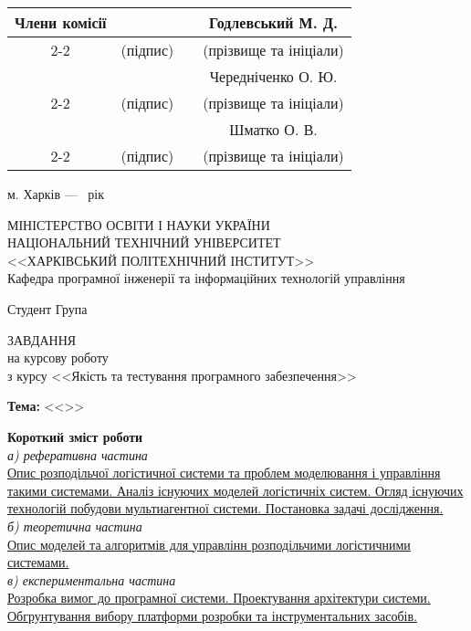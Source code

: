 {\begin{titlepage}
	\begin{flushright}
		\small
		\newcommand{\member}[1]{
			& \hspace{4cm} & & #1 \\ \cline{2-2} \cline{4-4} 
			& {\footnotesize (підпис)} & & {\footnotesize (прізвище та ініціали)}  \\
		}
		\begin{tabular}{cccc}
			Члени комісії 
			\member{Годлевський М. Д.}
			\member{Чередніченко О. Ю.}
			\member{Шматко О. В.}
		\end{tabular}
	\end{flushright}
	
	\vspace*{\fill}

	\begin{center}
		м. Харків --- \the\year~рік
	\end{center}
\end{titlepage}

\begin{titlepage}
	\begin{center}
		МІНІСТЕРСТВО ОСВІТИ І НАУКИ УКРАЇНИ \\
		НАЦІОНАЛЬНИЙ ТЕХНІЧНИЙ УНІВЕРСИТЕТ \\
		<<ХАРКІВСЬКИЙ ПОЛІТЕХНІЧНИЙ ІНСТИТУТ>> \\
		Кафедра програмної інженерії та інформаційних технологій управління
	\end{center}
	\noindent
	Студент \suline{\theauthor} \hfill Група 

	\vspace*{\fill}

	\begin{center}
		\MakeUppercase{Завдання} \\
		на курсову роботу \\
		з курсу <<Якість та тестування програмного забезпечення>>
	\end{center}
	\noindent
	\textbf{Тема:} <<\thetitle>>
	
	\vspace*{\fill}

	\begin{addmargin}[0cm]{1.5cm} 
		\textbf{Короткий зміст роботи} \\
		\textit{а) реферативна частина} \\
		\uline{
		Опис розподільчої логістичної системи та проблем моделювання і управління такими системами. 
		Аналіз існуючих моделей логістичніх систем. 
		Огляд існуючих технологій побудови мультиагентної системи. 
		Постановка задачі дослідження.
		} \\
		\textit{б) теоретична частина} \\
		\uline{
		Опис моделей та алгоритмів для управлінн розподільчими логістичними системами.
		} \\
		\textit{в) експериментальна частина} \\ 
		\uline{
		Розробка вимог до програмної системи.
		Проектування архітектури системи.
		Обгрунтування вибору платформи розробки та інструментальних засобів.
		}
	\end{addmargin}
	

\end{titlepage}}
